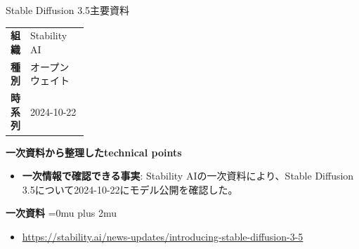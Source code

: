 \begin{technicalnote}{Stable Diffusion 3.5}{主要資料}
\begingroup
\begin{tabularx}{\linewidth}{@{}>{\bfseries}p{0.22\linewidth}X@{}}
組織 & Stability AI \\
種別 & オープンウェイト \\
時系列 & 2024-10-22 \\
\end{tabularx}
\smallskip
{\bfseries 一次資料から整理したtechnical points}
\begin{itemize}[leftmargin=1.5em,itemsep=0.35em]
\item \textbf{一次情報で確認できる事実}: Stability AIの一次資料により、Stable Diffusion 3.5について2024-10-22にモデル公開を確認した。
\end{itemize}
\begin{minipage}{\linewidth}
\begin{samepage}
{\bfseries 一次資料}
\begingroup\sloppy
\Urlmuskip=0mu plus 2mu\relax
\begin{itemize}[leftmargin=1.5em,itemsep=0.25em]
\item {\scriptsize\url{https://stability.ai/news-updates/introducing-stable-diffusion-3-5}}
\end{itemize}
\endgroup
\end{samepage}
\end{minipage}
\endgroup
\end{technicalnote}
\medskip

